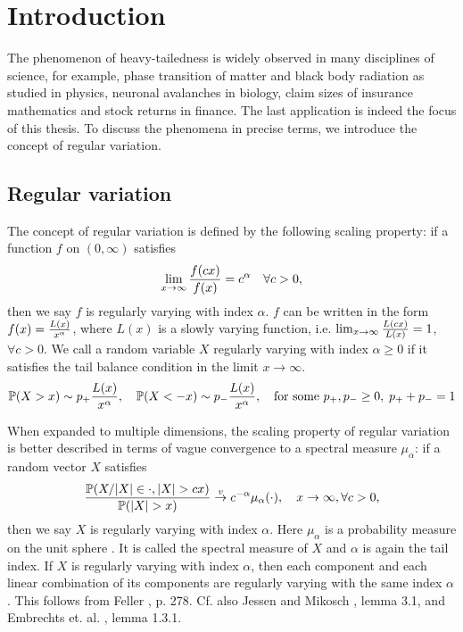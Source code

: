 \chapter{Introduction}\label{ch:intr}
The phenomenon of heavy-tailedness is widely observed in many
disciplines of science, for example, phase transition of matter and
black body radiation as studied in physics, neuronal avalanches in
biology, claim sizes of insurance mathematics and stock returns in
finance. The last application is indeed the focus of this thesis. To
discuss the phenomena in precise terms, we introduce the concept of
regular variation.

\section{Regular variation}\label{sec:intro_regvar}
The concept of regular variation is defined by the following scaling
property: if a function $f$ on $(0, \infty)$ satisfies
\[
\lim_{x \to \infty} {f(c x) \over f(x)} = c^\alpha
\quad
\forall c > 0,
\]
then we say $f$ is regularly varying with index $\alpha$.
$f$ can be written in the form $f(x) = {L(x) \over x^\alpha}$, where
$L(x)$ is a slowly varying function, i.e.
$\lim_{x \to \infty} {L(c x) \over L(x)} = 1$, $\forall c > 0$.
We call a random variable $X$ regularly varying with index
$\alpha \geq 0$ if it satisfies the tail balance condition in the
limit $x \to \infty$.
\[
\P(X > x) \sim p_+ {L(x) \over x^\alpha},\quad
\P(X < -x) \sim p_- {L(x) \over x^\alpha}, \quad
\text{for some } p_+, p_- \geq 0,\; p_+ + p_- = 1
\]

When expanded to multiple dimensions, the scaling property of regular
variation is better described in terms of vague convergence to a
spectral measure $\mu_\alpha$: if a random vector $X$ satisfies
\[
{
  \P(X/|X| \in \cdot, |X| > c x)
  \over
  \P(|X| > x)
}
\overset{v}{\to} c^{-\alpha} \mu_\alpha(\cdot),
\quad
x \to \infty, \forall c > 0,
\]
then we say $X$ is regularly varying with index $\alpha$. Here
$\mu_\alpha$ is a probability measure on the unit sphere
\cite{buraczewski:damek:mikosch:2016}. It is called the spectral 
measure of $X$ and $\alpha$ is again the tail index.
If $X$ is regularly varying with index $\alpha$, then each component
and each linear combination of its components are regularly
varying with the same index $\alpha$. This follows from Feller
\cite{feller}, p. 278. Cf. also Jessen and Mikosch
\cite{jessen:mikosch:2006}, lemma 3.1, and Embrechts et. al.
\cite{embrechts:klueppelberg:mikosch:1997}, lemma 1.3.1.

